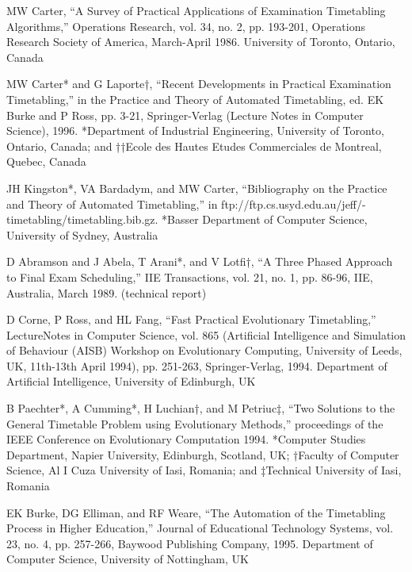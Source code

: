 \begin{thebibliography}{99}
 MW Carter, “A Survey of Practical Applications of Examination Timetabling Algorithms,”
Operations Research, vol. 34, no. 2, pp. 193-201, Operations Research Society
of America, March-April 1986. University of Toronto, Ontario, Canada

 MW Carter* and G Laporte†, “Recent Developments in Practical Examination Timetabling,”
in the Practice and Theory of Automated Timetabling, ed. EK Burke and P
Ross, pp. 3-21, Springer-Verlag (Lecture Notes in Computer Science), 1996.
*Department of Industrial Engineering, University of Toronto, Ontario, Canada;
and ††Ecole des Hautes Etudes Commerciales de Montreal, Quebec, Canada

 JH Kingston*, VA Bardadym, and MW Carter, “Bibliography on the Practice and
Theory of Automated Timetabling,” in ftp://ftp.cs.usyd.edu.au/jeff/-
timetabling/timetabling.bib.gz. *Basser Department of Computer Science,
University of Sydney, Australia

D Abramson and J Abela, T Arani*, and V Lotfi†, “A Three Phased Approach to
Final Exam Scheduling,” IIE Transactions, vol. 21, no. 1, pp. 86-96, IIE, Australia,
March 1989. (technical report)

D Corne, P Ross, and HL Fang, “Fast Practical Evolutionary Timetabling,” LectureNotes in Computer Science, vol. 865 (Artificial Intelligence and Simulation of
Behaviour (AISB) Workshop on Evolutionary Computing, University of Leeds, UK,
11th-13th April 1994), pp. 251-263, Springer-Verlag, 1994. Department of Artificial
Intelligence, University of Edinburgh, UK

B Paechter*, A Cumming*, H Luchian†, and M Petriuc‡, “Two Solutions to the General Timetable Problem using Evolutionary Methods,” proceedings of the IEEE
Conference on Evolutionary Computation 1994. *Computer Studies Department,
Napier University, Edinburgh, Scotland, UK; †Faculty of Computer Science, Al I
Cuza University of Iasi, Romania; and ‡Technical University of Iasi, Romania

EK Burke, DG Elliman, and RF Weare, “The Automation of the Timetabling Process in Higher Education,” Journal of Educational Technology Systems, vol. 23, no. 4,
pp. 257-266, Baywood Publishing Company, 1995. Department of Computer Science,
University of Nottingham, UK


\end{thebibliography}
